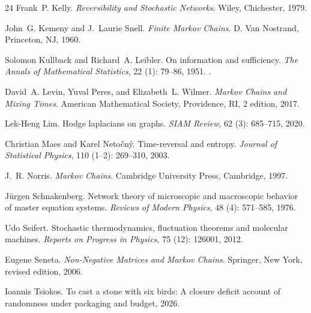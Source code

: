 \documentclass[11pt]{article}
\theoremstyle{definition}
\newcommand{\1}{\mathbf{1}}
\begin{document}
\begin{thebibliography}{24}
Frank~P. Kelly.
\newblock \emph{Reversibility and Stochastic Networks}.
\newblock Wiley, Chichester, 1979.

John~G. Kemeny and J.~Laurie Snell.
\newblock \emph{Finite Markov Chains}.
\newblock D. Van Nostrand, Princeton, NJ, 1960.

Solomon Kullback and Richard~A. Leibler.
\newblock On information and sufficiency.
\newblock \emph{The Annals of Mathematical Statistics}, 22 (1): 79--86, 1951.
\newblock {}.

David~A. Levin, Yuval Peres, and Elizabeth~L. Wilmer.
\newblock \emph{Markov Chains and Mixing Times}.
\newblock American Mathematical Society, Providence, RI, 2 edition, 2017.

Lek-Heng Lim.
\newblock Hodge laplacians on graphs.
\newblock \emph{SIAM Review}, 62 (3): 685--715, 2020.

Christian Maes and Karel Neto{\v c}n{\'y}.
\newblock Time-reversal and entropy.
\newblock \emph{Journal of Statistical Physics}, 110 (1--2): 269--310, 2003.

J.~R. Norris.
\newblock \emph{Markov Chains}.
\newblock Cambridge University Press, Cambridge, 1997.

J{\"u}rgen Schnakenberg.
\newblock Network theory of microscopic and macroscopic behavior of master equation systems.
\newblock \emph{Reviews of Modern Physics}, 48 (4): 571--585, 1976.

Udo Seifert.
\newblock Stochastic thermodynamics, fluctuation theorems and molecular machines.
\newblock \emph{Reports on Progress in Physics}, 75 (12): 126001, 2012.

Eugene Seneta.
\newblock \emph{Non-Negative Matrices and Markov Chains}.
\newblock Springer, New York, revised edition, 2006.

Ioannis Tsiokos.
\newblock To cast a stone with six birds: A closure deficit account of randomness under packaging and budget, 2026{}.


\end{thebibliography}
\end{document}

